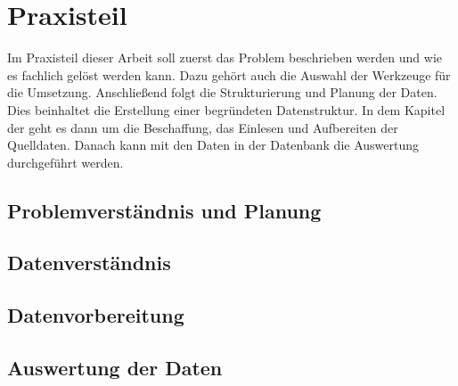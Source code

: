 \section{Praxisteil}


Im Praxisteil dieser Arbeit soll zuerst das Problem beschrieben werden und wie es fachlich gelöst werden kann. Dazu gehört auch die Auswahl der Werkzeuge für die Umsetzung. Anschließend folgt die Strukturierung und Planung der Daten. Dies beinhaltet die Erstellung einer begründeten Datenstruktur. In dem Kapitel der  geht es dann um die Beschaffung, das Einlesen und Aufbereiten der Quelldaten. Danach kann mit den Daten in der Datenbank die Auswertung durchgeführt werden.

\subsection{Problemverständnis und Planung}


\subsection{Datenverständnis}

\subsection{Datenvorbereitung}
\label{sec:datenvorbereitung}

\subsection{Auswertung der Daten}

\clearpage